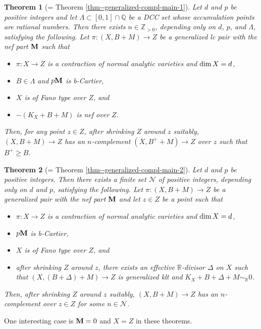 \documentclass[12pt]{amsart}
\newtheorem{thm}{Theorem}[section]
\theoremstyle{definition}
\begin{document}
\begin{thm}[= Theorem \ref{thm--generalized-compl-main-1}]\label{thm--generalized-compl-main-1-intro}
Let $d$ and $p$ be positive integers and let $\Lambda  \subset [0,1] \cap \mathbb{Q}$ be a DCC set whose accumulation points are rational numbers. 
Then there exists $n \in \mathbb{Z}_{>0}$, depending only on $d$, $p$, and $\Lambda$, satisfying the following. 
Let $\pi \colon(X,B+M) \to Z$ be a generalized lc pair with the nef part $\boldsymbol{\rm M}$ such that 
\begin{itemize}
\item
$\pi \colon X \to Z$ is a contraction of normal analytic varieties  and ${\rm dim}\,X=d$, 
\item
$B \in \Lambda$ and $p \boldsymbol{\rm M}$ is b-Cartier, 
\item
$X$ is of Fano type over $Z$, and 
\item
$-(K_{X}+B+M)$ is nef over $Z$.
\end{itemize} 
Then, for any point $z \in Z$, after shrinking $Z$ around $z$ suitably, $(X,B+M)\to Z$ has an $n$-complement $(X,B^{+}+M)\to Z$ over $z$ such that $B^{+} \geq B$. 
\end{thm}

\begin{thm}[= Theorem \ref{thm--generalized-compl-main-2}]\label{thm--generalized-compl-main-2-intro}
Let $d$ and $p$ be positive integers. 
Then there exists a finite set $\mathcal{N}$ of positive integers, depending only on $d$ and $p$, satisfying the following.
Let $\pi \colon(X,B+M) \to Z$ be a generalized pair with the nef part $\boldsymbol{\rm M}$ and let $z \in Z$ be a point such that 
\begin{itemize}
\item
$\pi \colon X \to Z$ is a contraction of normal analytic varieties and ${\rm dim}\,X=d$, 
\item
$p \boldsymbol{\rm M}$ is b-Cartier, 
\item
$X$ is of Fano type over $Z$, and 
\item
after shrinking $Z$ around $z$, there exists an effective $\mathbb{R}$-divisor $\Delta$ on $X$ such that $(X,(B+\Delta)+M) \to Z$ is generalized klt and $K_{X}+B+\Delta+M \sim_{\mathbb{R}} 0$.
\end{itemize} 
Then, after shrinking $Z$ around $z$ suitably, $(X,B+M) \to Z$ has an $n$-complement over $z \in Z$ for some $n \in \mathcal{N}$. 
\end{thm}

One interesting case is $\boldsymbol{\rm M}=0$ and $X=Z$ in these theorems. 
\end{document}
